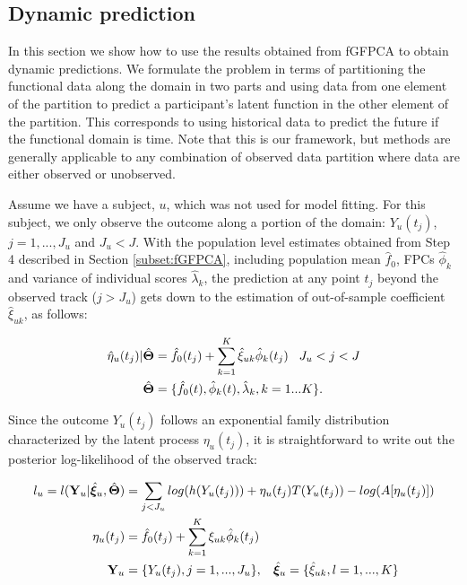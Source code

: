 \documentclass[12pt]{article}
\begin{document}
\subsection{Dynamic prediction}
\label{subsec:dyn_pred}

In this section we show how to use the results obtained from fGFPCA to obtain dynamic predictions. We formulate the problem in terms of partitioning the functional data along the domain in two parts and using data from one element of the partition to predict a participant's latent function in the other element of the partition. This corresponds to using historical data to predict the future if the functional domain is time. Note that this is our framework, but methods are generally applicable to any combination of observed data partition where data are either observed or unobserved.

Assume we have a subject, $u$, which was not used for model fitting. For this subject, we only observe the outcome along a portion of the domain: $Y_u(t_j)$, $j=1,...,J_u$ and $J_u < J$. With the population level estimates obtained from  Step 4 described in Section \ref{subset:fGFPCA}, including population mean $\hat{f}_0$, FPCs $\hat{\phi}_k$ and variance of individual scores $\hat{\lambda}_k$, the prediction at any point $t_j$ beyond the observed track ($j > J_u$) gets down to the estimation of out-of-sample coefficient $\hat{\xi}_{uk}$, as follows:

\[
\begin{aligned}
    \hat{\eta}_u(t_j)|\hat{\mathbf{\Theta}} &= \hat{f}_0(t_j)+\sum_{k=1}^K \hat{\xi}_{uk}\hat{\phi}_k(t_j)
    \hspace{0.3cm}  J_u < j < J  \\
    \hat{\mathbf{\Theta}} & = \{\hat{f}_0(t), \hat{\phi}_k(t), \hat{\lambda}_k, k = 1...K \}.
\end{aligned}
\]

Since the outcome $Y_u(t_j)$ follows an exponential family distribution characterized by the latent process $\eta_u(t_j)$, it is straightforward to write out the posterior log-likelihood of the observed track: 

\[
\begin{aligned}
    l_u = l(\mathbf{Y}_u | \hat{\boldsymbol{\xi}}_u, 
    \hat{\mathbf{\Theta}}) &=\sum_{j<J_u}log(h(Y_u(t_j)))+\eta_u(t_j)T(Y_u(t_j))-log(A[\eta_u(t_j)])\\
    \eta_u(t_j) & = \hat{f}_0(t_j)+\sum_{k=1}^K\xi_{uk}\hat{\phi}_k(t_j)\\
    \mathbf{Y}_u &= \{Y_u(t_j), j = 1,...,J_u \}, \hspace{0.3cm} \hat{\boldsymbol{\xi}}_u = \{\hat{\xi}_{uk}, l = 1,..., K \}\\
\end{aligned}
\]
\end{document}
